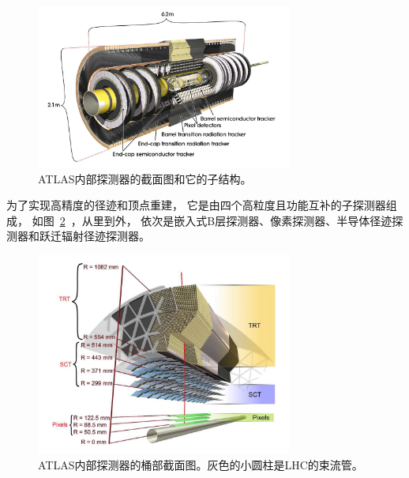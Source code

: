 \begin{figure}
  \begin{center}
    \includegraphics[width=0.75\textwidth]{figuresEXP/ATLAS6.jpg}
  \end{center}
  \caption{
ATLAS内部探测器的截面图和它的子结构。
  }
    \label{fig:ATLAS6}
\end{figure}

为了实现高精度的径迹和顶点重建，
它是由四个高粒度且功能互补的子探测器组成，
如图~\ref{fig:ATLAS7}~，从里到外，%
依次是嵌入式B层探测器、像素探测器、半导体径迹探测器和跃迁辐射径迹探测器。

\begin{figure}
  \begin{center}
    \includegraphics[width=0.75\textwidth]{figuresEXP/ATLAS7.jpg}
  \end{center}
  \caption{
ATLAS内部探测器的桶部截面图。灰色的小圆柱是LHC的束流管。
  }
    \label{fig:ATLAS7}
\end{figure}

